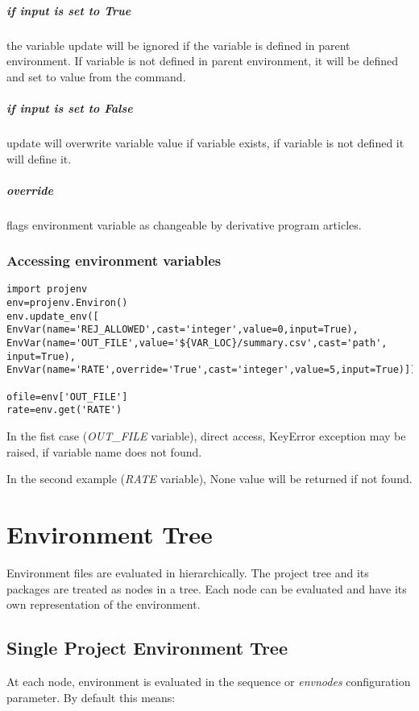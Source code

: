 \documentclass[design.tex]{subfiles}
\begin{document}
\paragraph {if input is set to True} the variable update will be ignored if the variable is defined in parent environment. If variable is not defined in parent environment, it will be defined and set to value from the command. 
\paragraph {if input is set to False} update will overwrite variable value if variable exists, if variable is not defined it will define it.
\paragraph{override} flags environment variable as changeable by derivative program articles.

\subsection{Accessing environment variables} 
\begin{lstlisting}
import projenv 
env=projenv.Environ()
env.update_env([
EnvVar(name='REJ_ALLOWED',cast='integer',value=0,input=True),
EnvVar(name='OUT_FILE',value='${VAR_LOC}/summary.csv',cast='path', input=True),
EnvVar(name='RATE',override='True',cast='integer',value=5,input=True)])

ofile=env['OUT_FILE']
rate=env.get('RATE')
\end{lstlisting}

In the fist case (\emph{OUT\_FILE} variable), direct access, KeyError exception may be raised, if variable name does not found.

In the second example (\emph{RATE} variable), None value will be returned if not found. 

\chapter{Environment Tree} 
Environment files are evaluated in hierarchically.  The project tree and its packages are treated as nodes in a tree.  Each node can be evaluated and have its own representation of the environment.
 
\section{Single Project Environment Tree}
At each node, environment is evaluated in the sequence or \emph{envnodes} configuration parameter.  By default this means:
\end{document}
